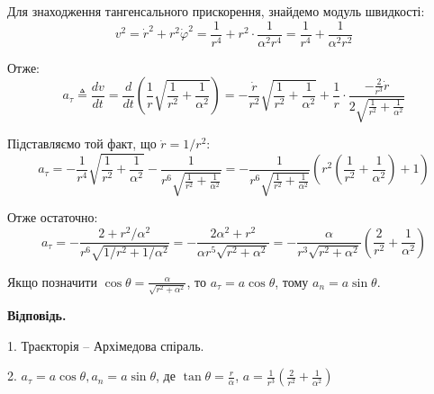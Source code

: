 \documentclass[12pt]{extarticle}
\begin{document}
Для знаходження тангенсального прискорення, знайдемо модуль швидкості:
\[
v^2 = \dot{r}^2 + r^2\dot{\varphi}^2 = \frac{1}{r^4} + r^2 \cdot \frac{1}{\alpha^2r^4} = \frac{1}{r^4} + \frac{1}{\alpha^2r^2}
\]

Отже:
\[
a_{\tau} \triangleq \frac{dv}{dt} = \frac{d}{dt}\left(\frac{1}{r}\sqrt{\frac{1}{r^2} + \frac{1}{\alpha^2}}\right) = -\frac{\dot{r}}{r^2}\sqrt{\frac{1}{r^2} + \frac{1}{\alpha^2}} + \frac{1}{r} \cdot \frac{-\frac{2}{r^3}\dot{r}}{2\sqrt{\frac{1}{r^2} + \frac{1}{\alpha^2}}}
\]

Підставляємо той факт, що $\dot{r}=1/r^2$:
\[
a_{\tau} = -\frac{1}{r^4}\sqrt{\frac{1}{r^2}+\frac{1}{\alpha^2}} - \frac{1}{r^6\sqrt{\frac{1}{r^2}+\frac{1}{\alpha^2}}} = -\frac{1}{r^6\sqrt{\frac{1}{r^2}+\frac{1}{\alpha^2}}}\left(r^2\left(\frac{1}{r^2}+\frac{1}{\alpha^2}\right) + 1\right)
\]

Отже остаточно:
\[
a_{\tau} = -\frac{2+r^2/\alpha^2}{r^6\sqrt{1/r^2+1/\alpha^2}} = -\frac{2\alpha^2+r^2}{\alpha r^5\sqrt{r^2+\alpha^2}} = -\frac{\alpha}{r^3\sqrt{r^2+\alpha^2}}\left(\frac{2}{r^2}+\frac{1}{\alpha^2}\right)
\]


Якщо позначити $\cos\theta = \frac{\alpha}{\sqrt{r^2+\alpha^2}}$, то $a_{\tau} = a \cos\theta$, тому $a_n = a\sin\theta$.

\textbf{Відповідь.} 

1. Траєкторія -- Архімедова спіраль.

2. $a_{\tau}=a \cos\theta, a_n = a\sin\theta$, де $\tan\theta = \frac{r}{\alpha}$, $a= \frac{1}{r^3}\left(\frac{2}{r^2}+\frac{1}{\alpha^2}\right)$
\end{document}
